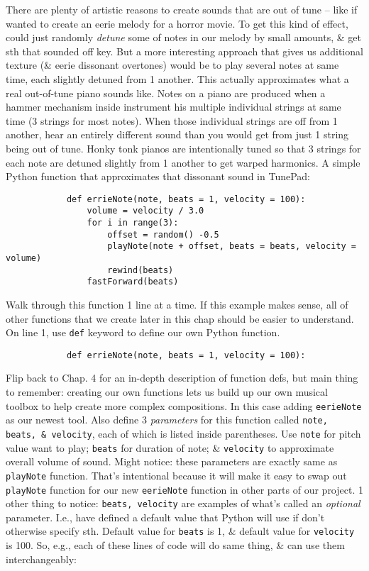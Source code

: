 \documentclass{article}
\begin{document}
\begin{itemize}
\begin{itemize}
		There are plenty of artistic reasons to create sounds that are out of tune -- like if wanted to create an eerie melody for a horror movie. To get this kind of effect, could just randomly {\it detune} some of notes in our melody by small amounts, \& get sth that sounded off key. But a more interesting approach that gives us additional texture (\& eerie dissonant overtones) would be to play several notes at same time, each slightly detuned from 1 another. This actually approximates what a real out-of-tune piano sounds like. Notes on a piano are produced when a hammer mechanism inside instrument his multiple individual strings at same time (3 strings for most notes). When those individual strings are off from 1 another, hear an entirely different sound than you would get from just 1 string being out of tune. Honky tonk pianos are intentionally tuned so that 3 strings for each note are detuned slightly from 1 another to get warped harmonics. A simple Python function that approximates that dissonant sound in TunePad:
		\begin{verbatim}
			def errieNote(note, beats = 1, velocity = 100):
			    volume = velocity / 3.0
			    for i in range(3):
			        offset = random() -0.5
			        playNote(note + offset, beats = beats, velocity = volume)
			        rewind(beats)
			    fastForward(beats)
		\end{verbatim}
		Walk through this function 1 line at a time. If this example makes sense, all of other functions that we create later in this chap should be easier to understand. On line 1, use {\tt def} keyword to define our own Python function.
		\begin{verbatim}
			def errieNote(note, beats = 1, velocity = 100):
		\end{verbatim}
		Flip back to Chap. 4 for an in-depth description of function defs, but main thing to remember: creating our own functions lets us build up our own musical toolbox to help create more complex compositions. In this case adding {\tt eerieNote} as our newest tool. Also define 3 {\it parameters} for this function called {\tt note, beats, \& velocity}, each of which is listed inside parentheses. Use {\tt note} for pitch value want to play; {\tt beats} for duration of note; \& {\tt velocity} to approximate overall volume of sound. Might notice: these parameters are exactly same as {\tt playNote} function. That's intentional because it will make it easy to swap out {\tt playNote} function for our new {\tt eerieNote} function in other parts of our project. 1 other thing to notice: {\tt beats, velocity} are examples of what's called an {\it optional} parameter. I.e., have defined a default value that Python will use if don't otherwise specify sth. Default value for {\tt beats} is 1, \& default value for {\tt velocity} is 100. So, e.g., each of these lines of code will do same thing, \& can use them interchangeably:

\end{itemize}
\end{itemize}
\end{document}
